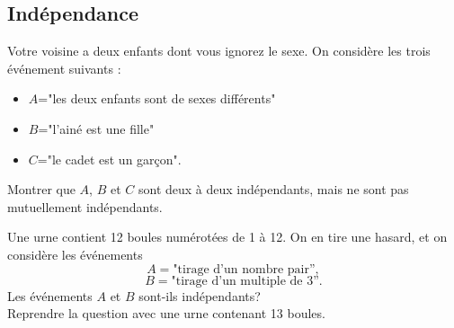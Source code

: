 \documentclass{book}
\begin{document}
\subsection*{Indépendance}
\begin{Exercice}
Votre voisine a deux enfants dont vous ignorez le sexe. On considère les trois événement suivants :
\begin{itemize}
\item $A$="les deux enfants sont de sexes différents"
\item $B$="l'ainé est une fille"
\item $C$="le cadet est un garçon".
\end{itemize}
Montrer que $A$, $B$ et $C$ sont deux à deux indépendants, mais ne sont pas mutuellement indépendants.
\end{Exercice}
\begin{Exercice}
Une urne contient 12 boules numérotées de 1 à 12. On en tire une hasard, et on considère les événements 
$$A=\textrm{"tirage d'un nombre pair''},$$
$$B=\textrm{"tirage d'un multiple de 3''}.$$
Les événements $A$ et $B$ sont-ils indépendants?\\
Reprendre la question avec une urne contenant 13 boules.
\end{Exercice}
\end{document}

